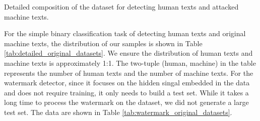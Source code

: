 \documentclass[11pt]{article}
\begin{document}
\begin{table}[ht]
	\centering
	\begin{minipage}[t]{0.58\textwidth} 
			\centering
			\caption{Detailed composition of the dataset for detecting human texts and attacked machine texts.}
			\label{tab:detailed_attack_datasets}
	\end{minipage}
	\hfill 
	\begin{minipage}[t]{0.38\textwidth}
			\centering
			\caption{Detailed composition of the attacked dataset for watermarks.}
			\label{tab:watermark_attack_datasets}
	\end{minipage}
\end{table}
For the simple binary classification task of detecting human texts and original machine texts, the distribution of our samples is shown in Table \ref{tab:detailed_original_datasets}. We ensure the distribution of human texts and machine texts is approximately 1:1. The two-tuple (human, machine) in the table represents the number of human texts and the number of machine texts. For the watermark detector, since it focuses on the hidden singal embedded in the data and does not require training, it only needs to build a test set. While it takes a long time to process the watermark on the dataset, we did not generate a large test set. The data are shown in Table \ref{tab:watermark_original_datasets}.
\end{document}
